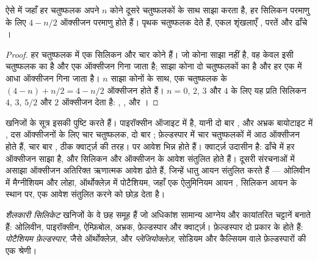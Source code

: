 \begin{proposition}[ऑक्सीजनों की गिनती]\label{prop:g11:minerals:sharing}
ऐसे  में जहाँ हर चतुष्फलक अपने $n$ कोने दूसरे चतुष्फलकों के साथ साझा
करता है, हर सिलिकन परमाणु के लिए $4 - n/2$ ऑक्सीजन परमाणु होते हैं। पृथक
चतुष्फलक  देते हैं, एकल शृंखलाएँ , परतें  और
ढाँचे ।
\end{proposition}

\begin{proof}
हर चतुष्फलक में एक सिलिकन और चार कोने हैं। जो कोना
साझा नहीं है, वह केवल इसी चतुष्फलक का है और एक ऑक्सीजन गिना जाता है; साझा
कोना दो चतुष्फलकों का है और हर एक में आधा ऑक्सीजन गिना जाता है।
$n$ साझा कोनों के साथ, एक चतुष्फलक के $(4 - n) + n/2 = 4 - n/2$ ऑक्सीजन होते हैं।
$n = 0$, $2$, $3$ और $4$ के लिए यह प्रति सिलिकन $4$, $3$, $5/2$ और $2$ ऑक्सीजन
देता है: , ,  और ।
\end{proof}

खनिजों के सूत्र इसकी पुष्टि करते हैं। पाइरॉक्सीन ऑजाइट में
 है, यानी दो बार , और अभ्रक बायोटाइट में ,
दस ऑक्सीजनों के लिए चार चतुष्फलक, दो बार ; फ़ेल्डस्पार में चार
चतुष्फलकों में आठ ऑक्सीजन होते हैं, चार बार , ठीक क्वार्ट्ज़ की तरह।
पर आवेश भिन्न होते हैं। क्वार्ट्ज़ उदासीन है: ढाँचे में हर ऑक्सीजन
साझा है, और सिलिकन और ऑक्सीजन के आवेश संतुलित होते हैं। दूसरी
संरचनाओं में असाझा ऑक्सीजन अतिरिक्त ऋणात्मक आवेश ढोते हैं, जिन्हें
धातु आयन संतुलित करते हैं --- ओलिवीन में मैग्नीशियम और लोहा, ऑर्थोक्लेज़ में पोटैशियम, जहाँ
एक ऐलुमिनियम आयन , सिलिकन आयन  के स्थान पर, एक
आवेश संतुलित करने को छोड़ देता है।

\begin{definition}[शैलकारी सिलिकेट]\label{def:g11:minerals:rock-forming}
\emph{शैलकारी सिलिकेट}  खनिजों के वे छह
समूह हैं जो अधिकांश सामान्य आग्नेय और
कायांतरित चट्टानें बनाते हैं: ओलिवीन, पाइरॉक्सीन, ऐम्फ़िबोल, अभ्रक,
फ़ेल्डस्पार और क्वार्ट्ज़। फ़ेल्डस्पार दो प्रकार के होते हैं: \emph{पोटैशियम
फ़ेल्डस्पार}, जैसे ऑर्थोक्लेज़, और \emph{प्लेजियोक्लेज़}, सोडियम और कैल्सियम
वाले फ़ेल्डस्पारों की एक श्रेणी।
\end{definition}

